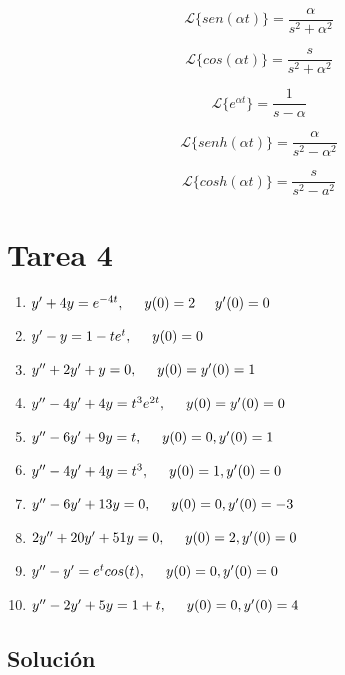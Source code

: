\documentclass{article}
\begin{document}
\[
    \mathcal{L}\{sen(\alpha t)\} = \frac{\alpha}{s^2 + \alpha^2}
\]

\[
    \mathcal{L}\{cos(\alpha t)\} = \frac{s}{s^2 + \alpha^2}
\]

\[
    \mathcal{L}\{e^{\alpha t}\} = \frac{1}{s - \alpha}
\]

\[
    \mathcal{L}\{senh(\alpha t)\} = \frac{\alpha}{s^2 - \alpha^2}
\]

\[
    \mathcal{L}\{cosh(\alpha t)\} = \frac{s}{s^2 - a^2}
\]

\newpage

\section{Tarea 4}

\begin{enumerate}
    \item $y' + 4y = e^{-4t}, \hspace{.5cm} y(0) = 2 \hspace{.5cm} y'(0)=0$
    \item $y' - y = 1 - te^{t}, \hspace{.5cm} y(0) = 0$
    \item $y'' + 2y' + y = 0, \hspace{.5cm} y(0) = y'(0) = 1$
    \item $y'' - 4y' + 4y = t^{3}e^{2t}, \hspace{.5cm} y(0) = y'(0) = 0 $
    \item $y'' - 6y' + 9y = t, \hspace{.5cm} y(0) = 0, y'(0) = 1$
    \item $y'' - 4y' + 4y = t^3, \hspace{.5cm} y(0) = 1, y'(0) = 0 $
    \item $y'' - 6y' + 13y = 0, \hspace{.5cm} y(0) = 0, y'(0) = -3$
    \item $2y'' + 20y' + 51y = 0, \hspace{.5cm} y(0) = 2, y'(0) = 0$
    \item $y'' - y' = e^{t}cos(t), \hspace{.5cm} y(0) = 0, y'(0) = 0 $
    \item $y'' - 2y' + 5y = 1 + t, \hspace{.5cm} y(0) = 0, y'(0) = 4$
\end{enumerate}

\newpage

\subsection{Solución}
\end{document}
